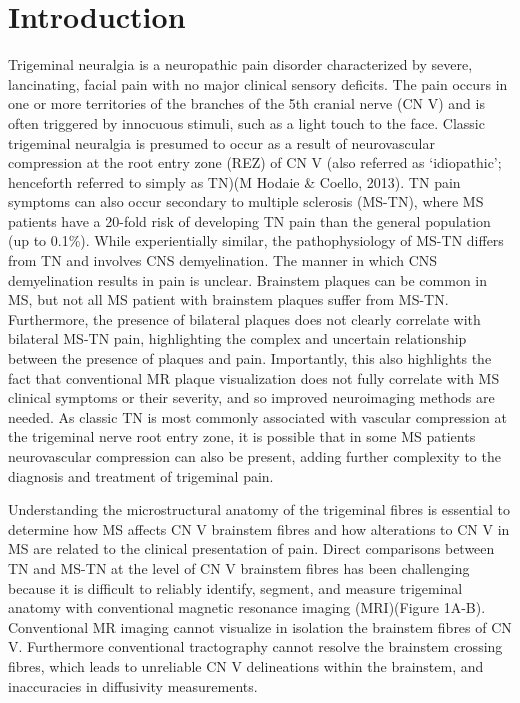 \section{Introduction}
Trigeminal neuralgia is a neuropathic pain disorder characterized by severe, lancinating, facial pain with no major clinical sensory deficits. The pain occurs in one or more territories of the branches of the 5th cranial nerve (CN V) and is often triggered by innocuous stimuli, such as a light touch to the face. Classic trigeminal neuralgia is presumed to occur as a result of neurovascular compression at the root entry zone (REZ) of CN V (also referred as ‘idiopathic’; henceforth referred to simply as TN)(M Hodaie \& Coello, 2013). TN pain symptoms can also occur secondary to multiple sclerosis (MS-TN), where MS patients have a 20-fold risk of developing TN pain than the general population (up to 0.1\%)\cite{VanHecke2014}. 
While experientially similar, the pathophysiology of MS-TN differs from TN and involves CNS demyelination\cite{lazar1979trigeminal,Nurmikko2009}. The manner in which CNS demyelination results in pain is unclear. Brainstem plaques can be common in MS, but not all MS patient with brainstem plaques suffer from MS-TN. Furthermore, the presence of bilateral plaques does not clearly correlate with bilateral MS-TN pain\cite{DeSanti2011a,Love2001a}, highlighting the complex and uncertain relationship between the presence of plaques and pain\cite{DaSilva2005}. Importantly, this also highlights the fact that conventional MR plaque visualization does not fully correlate with MS clinical symptoms or their severity, and so improved neuroimaging methods are needed\cite{Seixas2014}. As classic TN is most commonly associated with vascular compression at the trigeminal nerve root entry zone, it is possible that in some MS patients neurovascular compression can also be present, adding further complexity to the diagnosis and treatment of trigeminal pain\cite{Sandell2010e}.

Understanding the microstructural anatomy of the trigeminal fibres is essential to determine how MS affects CN V brainstem fibres and how alterations to CN V in MS are related to the clinical presentation of pain. Direct comparisons between TN and MS-TN at the level of CN V brainstem fibres has been challenging because it is difficult to reliably identify, segment, and measure trigeminal anatomy with conventional magnetic resonance imaging (MRI)(Figure 1A-B)\cite{Cruccu2009,DaSilva2005}. Conventional MR imaging cannot visualize in isolation the brainstem fibres of CN V. Furthermore conventional tractography cannot resolve the brainstem crossing fibres\cite{Farquharson2013}, which leads to unreliable CN V delineations within the brainstem, and inaccuracies in diffusivity measurements. 

